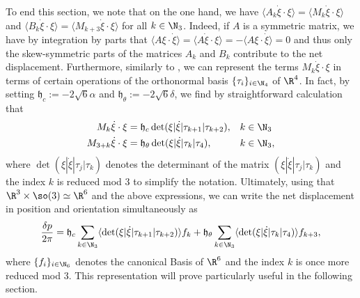 To end this section, we note that on the one hand, we have $\langle A_k \dot{\xi} \cdot \xi \rangle = \langle M_k \dot{\xi} \cdot \xi \rangle$ and $\langle B_k \dot{\xi} \cdot \xi \rangle = \langle M_{k + 3} \dot{\xi} \cdot \xi \rangle$ for all $k \in \N_3$. Indeed, if $A$ is a symmetric matrix, we have by integration by parts that $\langle A \xi \cdot \dot{\xi} \rangle = \langle A \dot{\xi} \cdot \xi \rangle = - \langle A \xi \cdot \dot{\xi} \rangle = 0 $ and thus only the skew-symmetric parts of the matrices $A_k$ and $B_k$ contribute to the net displacement. Furthermore, similarly to \cite{Alouges2017}, we can represent the terms $ M_k \dot{\xi} \cdot \xi$ in terms of certain operations of the orthonormal basis $\{\tau_i\}_{i \in \N_4}$ of $\R^4$. In fact, by setting $\mathfrak{h}_c := -2\sqrt{6} \alpha$ and $\mathfrak{h}_{\theta} := -2\sqrt{6}\delta$, we find by straightforward calculation that
\begin{align}
  M_k \dot{\xi} \cdot \xi &= \mathfrak{h}_c \det( \xi | \dot{\xi} | \tau_{k+1} | \tau_{k+2}), & & k \in \N_3 \\
  M_{3 + k} \dot{\xi} \cdot \xi &= \mathfrak{h}_{\theta} \det ( \xi | \dot{\xi} | \tau_{k} | \tau_{4}), & & k \in \N_3,
\end{align}
where $\det(\xi|\dot{\xi}|\tau_j|\tau_k)$ denotes the determinant of the matrix $(\xi|\dot{\xi}|\tau_j |\tau_k)$ and the index $k$ is reduced mod 3 to simplify the notation. Ultimately, using that $\R^3 \times \so(3) \simeq \R^6$ and the above expressions, we can write the net displacement in position and orientation simultaneously as
\begin{equation}
\label{eq: net displacement}
\frac{\delta p}{2 \pi}= \mathfrak{h}_c \sum_{k \in \N_3}\langle \det( \xi | \dot{\xi} | \tau_{k+1} | \tau_{k+2}) \rangle f_k + \mathfrak{h}_\theta \sum_{k \in \N_3}\langle \det ( \xi | \dot{\xi} | \tau_{k} | \tau_{4})\rangle f_{k + 3},
\end{equation}
where $\{f_i\}_{i \in \N_6}$ denotes the canonical Basis of $\R^6$ and the index $k$ is once more reduced mod 3. This representation will prove particularly useful in the following section.